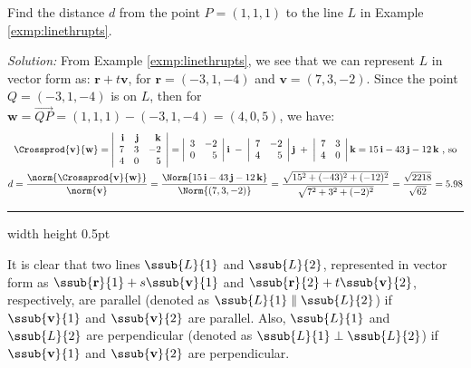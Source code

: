 \begin{exmp}
 Find the distance $d$ from the point $P = (1,1,1)$ to the line $L$ in Example \ref{exmp:linethrupts}.\vspace{1mm}
 \par\noindent\emph{Solution:} From Example \ref{exmp:linethrupts}, we see that we can represent $L$ in vector form as:
 $\textbf{r} + t \textbf{v}$, for $\textbf{r} = (-3,1,-4)$ and $\textbf{v} = (7,3,-2)$. Since the point $Q = (-3,1,-4)$
 is on $L$, then for $\textbf{w} = \overrightarrow{QP} = (1,1,1) - (-3,1,-4) = (4,0,5)$, we have:
 \begin{gather*}
  \Crossprod{\textbf{v}}{\textbf{w}} = \left|\begin{array}{rrr}\textbf{i} & \textbf{j} & \textbf{k}\\7 & 3 & -2\\
   4 & 0 & 5\end{array}\right|
   = \left|\begin{array}{rr}3 & -2\\0 & 5\end{array}\right| \textbf{i} \;-\;
     \left|\begin{array}{rr}7 & -2\\4 & 5\end{array}\right| \textbf{j} \;+\;
     \left|\begin{array}{rr}7 & 3\\4 & 0\end{array}\right| \textbf{k}
   = 15\,\textbf{i} - 43\,\textbf{j} - 12\,\textbf{k} \text{~,~so}\\
  d = \frac{\norm{\Crossprod{\textbf{v}}{\textbf{w}}}}{\norm{\textbf{v}}} =
   \frac{\Norm{15\,\textbf{i} - 43\,\textbf{j} - 12\,\textbf{k}}}{\Norm{(7,3,-2)}}
  = \frac{\sqrt{15^2 + (-43)^2 + (-12)^2}}{\sqrt{7^2 + 3^2 + (-2)^2}}
  = \frac{\sqrt{2218}}{\sqrt{62}} = 5.98
 \end{gather*}
\end{exmp}\vspace{-1mm}
\hrule width \textwidth height 0.5pt
\vspace{2mm}

It is clear that two lines $\ssub{L}{1}$ and $\ssub{L}{2}$, represented in vector form as
$\ssub{\textbf{r}}{1} + s \ssub{\textbf{v}}{1}$ and $\ssub{\textbf{r}}{2} + t \ssub{\textbf{v}}{2}$, respectively, are
parallel (denoted as $\ssub{L}{1} \parallel \ssub{L}{2}$) if $\ssub{\textbf{v}}{1}$ and $\ssub{\textbf{v}}{2}$ are
parallel. Also, $\ssub{L}{1}$ and $\ssub{L}{2}$ are perpendicular (denoted as $\ssub{L}{1} \perp \ssub{L}{2}$) if
$\ssub{\textbf{v}}{1}$ and $\ssub{\textbf{v}}{2}$ are perpendicular.

